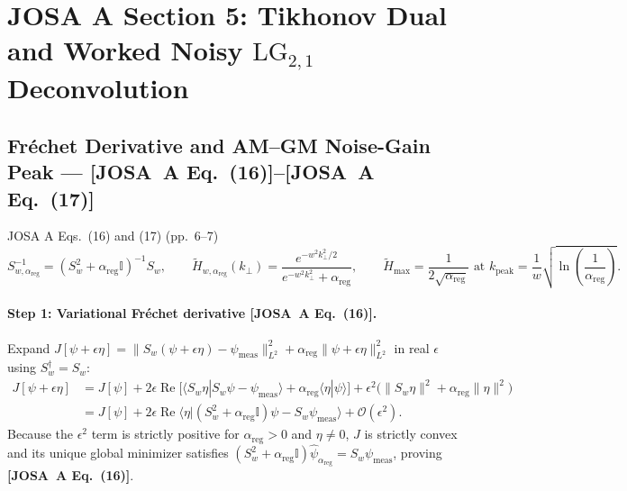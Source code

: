 \documentclass[10pt,letterpaper]{article}
\newcommand{\braket}[2]{\langle #1 | #2 \rangle}
\newcommand{\norm}[1]{\lVert #1 \rVert}
\newcommand{\josa}[1]{\textbf{[JOSA~A Eq.~(#1)]}}
\numberwithin{equation}{section}
\begin{document}
\section{JOSA A Section 5: Tikhonov Dual and Worked Noisy $\mathrm{LG}_{2,1}$ Deconvolution}
\label{sec:s5}

\subsection{Fr\'echet Derivative and AM--GM Noise-Gain Peak --- \josa{16}--\josa{17}}
\label{sec:s5_tikhonov}

\begin{targeteq}{JOSA A Eqs.~(16) and (17) (pp.~6--7)}
\[
  S_{w,\alpha_{\mathrm{reg}}}^{-1} = (S_w^2 + \alpha_{\mathrm{reg}}\mathbb{I})^{-1}S_w, \qquad
  \widetilde{H}_{w,\alpha_{\mathrm{reg}}}(k_\perp) = \frac{e^{-w^2 k_\perp^2/2}}{e^{-w^2 k_\perp^2} + \alpha_{\mathrm{reg}}}, \qquad
  \widetilde{H}_{\max} = \frac{1}{2\sqrt{\alpha_{\mathrm{reg}}}}\text{ at } k_{\mathrm{peak}} = \frac{1}{w}\sqrt{\ln\!\left(\frac{1}{\alpha_{\mathrm{reg}}}\right)}.
\]
\end{targeteq}

\paragraph*{Step 1: Variational Fr\'echet derivative \josa{16}.}
Expand $J[\psi + \epsilon\eta] = \norm{S_w(\psi + \epsilon\eta) - \psi_{\mathrm{meas}}}_{L^2}^2 + \alpha_{\mathrm{reg}}\norm{\psi + \epsilon\eta}_{L^2}^2$ in real $\epsilon$ using $S_w^\dagger = S_w$:
\begin{align}
  J[\psi + \epsilon\eta] &= J[\psi] + 2\epsilon\operatorname{Re}\bigl[\braket{S_w\eta}{S_w\psi - \psi_{\mathrm{meas}}} + \alpha_{\mathrm{reg}}\braket{\eta}{\psi}\bigr] + \epsilon^2\bigl(\norm{S_w\eta}^2 + \alpha_{\mathrm{reg}}\norm{\eta}^2\bigr) \nonumber \\
  &= J[\psi] + 2\epsilon\operatorname{Re}\braket{\eta}{(S_w^2 + \alpha_{\mathrm{reg}}\mathbb{I})\psi - S_w\psi_{\mathrm{meas}}} + \mathcal{O}(\epsilon^2).
\end{align}
Because the $\epsilon^2$ term is strictly positive for $\alpha_{\mathrm{reg}} > 0$ and $\eta \neq 0$, $J$ is strictly convex and its unique global minimizer satisfies $(S_w^2 + \alpha_{\mathrm{reg}}\mathbb{I})\hat{\psi}_{\alpha_{\mathrm{reg}}} = S_w\psi_{\mathrm{meas}}$, proving \josa{16}.
\end{document}
